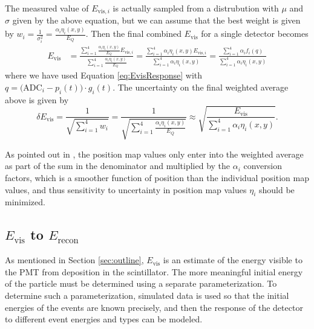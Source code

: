 The measured value of $E_{\mathrm{vis},i}$ is actually sampled from a distrubution with $\mu$ and $\sigma$ given by the
above equation, but we can assume that the best weight is given by $w_i = \frac{1}{\sigma_i^2} = \frac{\alpha_i \eta_i(x,y)}{E_Q}$.
Then the final combined $E_{\mathrm{vis}}$ for a single detector becomes
%
\begin{align}
  E_{\mathrm{vis}} &= \frac{\sum_{i=1}^{4} \frac{\alpha_i \eta_i(x,y)}{E_Q} E_{\mathrm{vis},i}}{\sum_{i=1}^{4} \frac{\alpha_i \eta_i(x,y)}{E_Q}}
  = \frac{\sum_{i=1}^{4} \alpha_i \eta_i(x,y) E_{\mathrm{vis},i}}{\sum_{i=1}^{4} \alpha_i \eta_i(x,y)} 
  = \frac{\sum_{i=1}^{4} \alpha_i f_i(q)}{\sum_{i=1}^{4} \alpha_i \eta_i(x,y)}
\end{align}
%
where we have used Equation \ref{eq:EvisResponse} with $q=\big( \mathrm{ADC}_i - p_i(t) \big) \cdot g_i(t)$.
The uncertainty on the final weighted average above is given by
\begin{equation}
  \delta E_{\mathrm{vis}} = \frac{1}{\sqrt{\sum_{i=1}^{4} w_i}} = \frac{1}{\sqrt{\sum_{i=1}^{4} \frac{\alpha_i \eta_i(x,y)}{E_Q}}}
    \approx  \sqrt{\frac{E_{\mathrm{vis}}}{\sum_{i=1}^{4}\alpha_i \eta_i(x,y)}}.
\end{equation}

As pointed out in \cite{mpmThesis}, the position map values only enter into the weighted average
as part of the sum in the denominator and multiplied by the $\alpha_i$ conversion factors, which is a smoother
function of position than the individual position map values, and thus sensitivity to uncertainty in position map
values $\eta_i$ should be minimized.

\subsection{$E_{\mathrm{vis}}$ to $E_{\mathrm{recon}}$}

As mentioned in Section \ref{sec:outline}, $E_{\mathrm{vis}}$ is an estimate of the
energy visible to the PMT from deposition in the scintillator. The more meaningful
initial energy of the particle must be determined using a separate parameterization.
To determine such a parameterization, simulated data is used so that the initial
energies of the events are known precisely, and then the response of the detector
to different event energies and types can be modeled.

